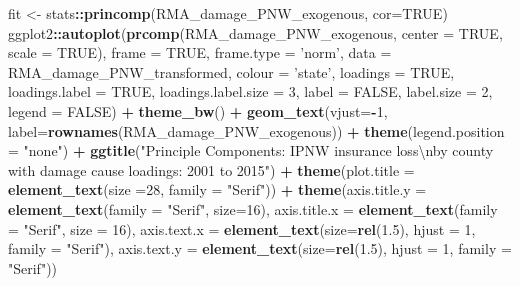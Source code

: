 \documentclass[]{article}
\newenvironment{Shaded}{\begin{snugshade}}{\end{snugshade}}
\newcommand{\CharTok}[1]{\textcolor[rgb]{0.31,0.60,0.02}{#1}}
\newcommand{\DataTypeTok}[1]{\textcolor[rgb]{0.13,0.29,0.53}{#1}}
\newcommand{\DecValTok}[1]{\textcolor[rgb]{0.00,0.00,0.81}{#1}}
\newcommand{\FloatTok}[1]{\textcolor[rgb]{0.00,0.00,0.81}{#1}}
\newcommand{\KeywordTok}[1]{\textcolor[rgb]{0.13,0.29,0.53}{\textbf{#1}}}
\newcommand{\NormalTok}[1]{#1}
\newcommand{\OperatorTok}[1]{\textcolor[rgb]{0.81,0.36,0.00}{\textbf{#1}}}
\newcommand{\OtherTok}[1]{\textcolor[rgb]{0.56,0.35,0.01}{#1}}
\newcommand{\StringTok}[1]{\textcolor[rgb]{0.31,0.60,0.02}{#1}}
\begin{document}
\begin{Shaded}
\begin{Highlighting}[]
\NormalTok{fit <-}\StringTok{ }\NormalTok{stats}\OperatorTok{::}\KeywordTok{princomp}\NormalTok{(RMA_damage_PNW_exogenous, }\DataTypeTok{cor=}\OtherTok{TRUE}\NormalTok{)}
\NormalTok{ggplot2}\OperatorTok{::}\KeywordTok{autoplot}\NormalTok{(}\KeywordTok{prcomp}\NormalTok{(RMA_damage_PNW_exogenous, }\DataTypeTok{center =} \OtherTok{TRUE}\NormalTok{, }\DataTypeTok{scale =} \OtherTok{TRUE}\NormalTok{), }\DataTypeTok{frame =} \OtherTok{TRUE}\NormalTok{, }\DataTypeTok{frame.type =} \StringTok{'norm'}\NormalTok{, }\DataTypeTok{data =}\NormalTok{ RMA_damage_PNW_transformed, }\DataTypeTok{colour =} \StringTok{'state'}\NormalTok{, }\DataTypeTok{loadings =} \OtherTok{TRUE}\NormalTok{, }\DataTypeTok{loadings.label =} \OtherTok{TRUE}\NormalTok{, }\DataTypeTok{loadings.label.size  =} \DecValTok{3}\NormalTok{, }\DataTypeTok{label =} \OtherTok{FALSE}\NormalTok{, }\DataTypeTok{label.size =} \DecValTok{2}\NormalTok{, }\DataTypeTok{legend =} \OtherTok{FALSE}\NormalTok{)  }\OperatorTok{+}\StringTok{ }\KeywordTok{theme_bw}\NormalTok{()   }\OperatorTok{+}\StringTok{ }\KeywordTok{geom_text}\NormalTok{(}\DataTypeTok{vjust=}\OperatorTok{-}\DecValTok{1}\NormalTok{, }\DataTypeTok{label=}\KeywordTok{rownames}\NormalTok{(RMA_damage_PNW_exogenous)) }\OperatorTok{+}\StringTok{ }\KeywordTok{theme}\NormalTok{(}\DataTypeTok{legend.position =} \StringTok{"none"}\NormalTok{) }\OperatorTok{+}\StringTok{ }\KeywordTok{ggtitle}\NormalTok{(}\StringTok{"Principle Components: IPNW insurance loss}\CharTok{\textbackslash{}n}\StringTok{by county with damage cause loadings: 2001 to 2015"}\NormalTok{) }\OperatorTok{+}\StringTok{ }\KeywordTok{theme}\NormalTok{(}\DataTypeTok{plot.title =} \KeywordTok{element_text}\NormalTok{(}\DataTypeTok{size =}\DecValTok{28}\NormalTok{, }\DataTypeTok{family =} \StringTok{"Serif"}\NormalTok{)) }\OperatorTok{+}\StringTok{ }\KeywordTok{theme}\NormalTok{(}\DataTypeTok{axis.title.y =} \KeywordTok{element_text}\NormalTok{(}\DataTypeTok{family =} \StringTok{"Serif"}\NormalTok{, }\DataTypeTok{size=}\DecValTok{16}\NormalTok{), }\DataTypeTok{axis.title.x =} \KeywordTok{element_text}\NormalTok{(}\DataTypeTok{family =} \StringTok{"Serif"}\NormalTok{, }\DataTypeTok{size =} \DecValTok{16}\NormalTok{), }\DataTypeTok{axis.text.x =} \KeywordTok{element_text}\NormalTok{(}\DataTypeTok{size=}\KeywordTok{rel}\NormalTok{(}\FloatTok{1.5}\NormalTok{), }\DataTypeTok{hjust =} \DecValTok{1}\NormalTok{, }\DataTypeTok{family =} \StringTok{"Serif"}\NormalTok{), }\DataTypeTok{axis.text.y =} \KeywordTok{element_text}\NormalTok{(}\DataTypeTok{size=}\KeywordTok{rel}\NormalTok{(}\FloatTok{1.5}\NormalTok{), }\DataTypeTok{hjust =} \DecValTok{1}\NormalTok{, }\DataTypeTok{family =} \StringTok{"Serif"}\NormalTok{))}
\end{Highlighting}
\end{Shaded}
\end{document}
